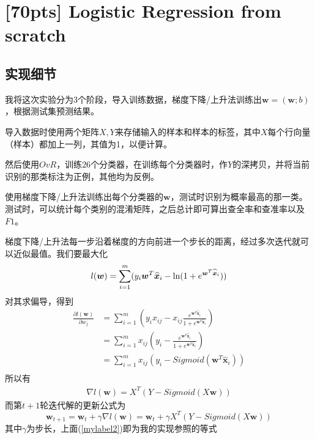 \documentclass{article}
\begin{document}
\section{[70pts] Logistic Regression from scratch  }
\subsection{实现细节}
    我将这次实验分为3个阶段，导入训练数据，梯度下降/上升法训练出${\bm w} = ({\bm w}; b)$，根据测试集预测结果。

    导入数据时使用两个矩阵$X,Y$来存储输入的样本和样本的标签，其中$X$每个行向量（样本）都加上一列，其值为1，以便计算。

    然后使用$OvR$，训练$26$个分类器，在训练每个分类器时，作$Y$的深拷贝，并将当前识别的那类标注为正例，其他均为反例。
    
    使用梯度下降/上升法训练出每个分类器的${\bm w}$，测试时识别为概率最高的那一类。测试时，可以统计每个类别的混淆矩阵，之后总计即可算出查全率和查准率以及$F1$。

    梯度下降/上升法每一步沿着梯度的方向前进一个步长的距离，经过多次迭代就可以近似最值。我们要最大化
\begin{equation}
    l({\bm w}) = \sum_{i=1}^m (y_{i} {\bm w^T} {{\bm {\widehat x}_i}}
            -{\rm ln}(1+e^{{\bm w^T} {{\bm {\widehat x}_i}}}))
\end{equation}
对其求偏导，得到
\begin{equation}
    \begin{aligned}
        \frac{\partial l({\bm w})}{\partial w_j} 
        &= \sum_{i=1}^m (y_{i}  x_{ij}
            -x_{ij} \frac{e^{{\bm w^T} {{\bm {\widehat x}_i}}}}{1+e^{{\bm w^T} {{\bm {\widehat x}_i}}}})\\
        &= \sum_{i=1}^m x_{ij}(y_{i}  
        - \frac{e^{{\bm w^T} {{\bm {\widehat x}_i}}}}{1+e^{{\bm w^T} {{\bm {\widehat x}_i}}}})\\
        &= \sum_{i=1}^m x_{ij}(y_{i} - Sigmoid({\bm w^T} {{\bm {\widehat x}_i}}))\\
    \end{aligned}
\end{equation}
所以有
\begin{equation}
    \begin{aligned}
        \nabla l({\bm w}) = X^T(Y - Sigmoid(X {\bm w} ))
    \end{aligned}
\end{equation}
而第$t+1$轮迭代解的更新公式为
\begin{equation}
    {\bm w}_{t+1} = {\bm w}_t + \gamma \nabla l({\bm w}) = {\bm w}_t + \gamma X^T(Y - Sigmoid(X {\bm w} ))\label{mylabel2}
\end{equation}
其中$\gamma$为步长，上面(\ref{mylabel2})即为我的实现参照的等式
\end{document}
